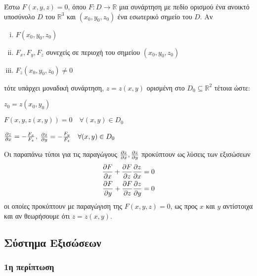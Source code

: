 Έστω $ F(x,y,z) = 0 $, όπου $F\colon D \to \mathbb{R}$ μια συνάρτηση με πεδίο ορισμού 
ένα ανοικτό υποσύνολο $ D $ του $ \mathbb{R}^{3}  $ και $ (x_0,y_0,z_0) $ ένα 
εσωτερικό σημείο του $ D $. Αν
\begin{enumerate}[(i)]
    \item $ F(x_0,y_0,z_0) $
    \item $ F_x, F_y, F_z $ συνεχείς σε περιοχή του σημείου $ (x_0,y_0,z_0) $
    \item $ F_z(x_0,y_0,z_0) \neq 0 $
\end{enumerate}
τότε υπάρχει μοναδική συνάρτηση, $ z=z(x,y) $ ορισμένη στο 
$ D_0 \subseteq \mathbb{R}^{2} $ τέτοια ώστε:
\begin{myitemize}
    \item $ z_0 = z(x_0,y_0) $
    \item $ F(x,y,z(x,y)) = 0  \quad \forall (x,y)\in  D_0 $
    \item $ \pdv{z}{x} = - \frac{F_x}{F_z} $, $ \pdv{z}{y} = - \frac{F_y}{F_z}\quad 
        \forall (x,y) \in D_0$
\end{myitemize}

\begin{rem}
    Οι παραπάνω τύποι για τις παραγώγους $ \pdv{z}{x}, \pdv{z}{y} $ προκύπτουν 
    ως λύσεις των εξισώσεων  
    \begin{align*}	
    \pdv{F}{x} + \pdv{F}{z}\pdv{z}{x} &= 0 \\
    \pdv{F}{y} + \pdv{F}{z}\pdv{z}{y} &= 0 
\end{align*}
οι οποίες προκύπτουν με παραγώγιση της $ F(x,y,z) = 0 $, ως προς $x$ και $y$ 
αντίστοιχα και  αν θεωρήσουμε ότι $ z=z(x,y) $.

\end{rem}

\subsection{Σύστημα Εξισώσεων}

\subsubsection{1η περίπτωση}

